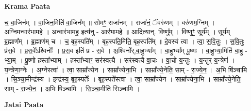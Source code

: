 \documentclass[17pt]{extarticle}
\begin{document}
\textbf{Krama Paata} \newline

च॒ वा॒जिन᳚म् । वा॒जिन॒मिति॑ वा॒जिन᳚म् ॥ सोमꣳ॒॒ राजा॑नम् । राजा॑नं॒ ॅवरु॑णम् । वरु॑णम॒ग्निम् । अ॒ग्निम॒न्वार॑भामहे । अ॒न्वार॑भामह॒ इत्य॑नु - आर॑भामहे ॥ आ॒दि॒त्यान्. विष्णु᳚म् । विष्णुꣳ॒॒ सूर्य᳚म् । सूर्य॑म् ब्र॒ह्माण᳚म् । ब्र॒ह्माण॑म् च । च॒ बृह॒स्पति᳚म् । बृह॒स्पति॒मिति॒ बृह॒स्पति᳚म् ॥ दे॒वस्य॑ त्वा । त्वा॒ स॒वि॒तुः । स॒वि॒तुः प्र॑स॒वे । प्र॒स॒वे᳚ऽश्विनोः᳚ । प्र॒स॒व इति॑ प्र - स॒वे । अ॒श्विनो᳚र्,बा॒हुभ्या᳚म् । बा॒हुभ्या᳚म् पू॒ष्णः । बा॒हुभ्या॒मिति॑ बा॒हु - भ्या॒म् । पू॒ष्णो हस्ता᳚भ्याम् । हस्ता᳚भ्याꣳ॒॒ सर॑स्वत्यै । सर॑स्वत्यै वा॒चः । वा॒चो य॒न्तुः । य॒न्तुर् य॒न्त्रेण॑ । य॒न्त्रेणा॒ग्नेः । अ॒ग्नेस्त्वा᳚ । त्वा॒ साम्रा᳚ज्येन । साम्रा᳚ज्येना॒भि । साम्रा᳚ज्ये॒नेति॒ साम् - रा॒ज्ये॒न॒ । अ॒भि षि॑ञ्चामि । सि॒ञ्चा॒मीन्द्र॑स्य । इन्द्र॑स्य॒ बृह॒स्पतेः᳚ । बृह॒स्पते᳚स्त्वा । त्वा॒ साम्रा᳚ज्येन । साम्रा᳚ज्येना॒भि । साम्रा᳚ज्ये॒नेति॒ साम् - रा॒ज्ये॒न॒ । अ॒भि षि॑ञ्चामि । सि॒ञ्चा॒मीति॑ सिञ्चामि । \newline

\textbf{Jatai Paata} \newline
\end{document}
